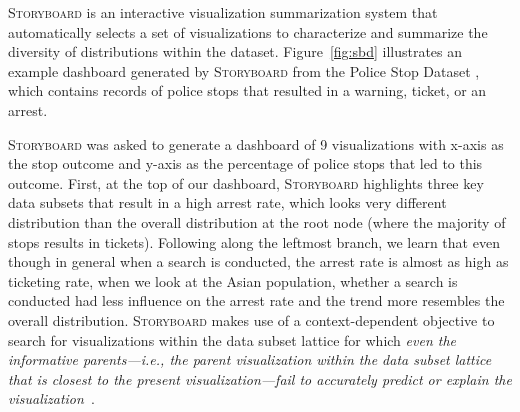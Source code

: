 \documentclass[11pt]{article}
\newcommand{\techreport}[1]{}
\newcommand{\sbd}{\textsc{Storyboard}\xspace}
\begin{document}
\par \sbd is an interactive visualization 
summarization system that automatically 
selects a set of visualizations 
to characterize and summarize 
the diversity of distributions within the dataset. 
Figure~\ref{fig:sbd} illustrates 
an example dashboard generated by \sbd 
from the Police Stop Dataset \cite{police}, 
which contains records of police stops 
that resulted in a warning, ticket, or an arrest. 
\techreport{The attributes in the dataset 
include driver gender, age, race, 
and the stop time, 
whether a search was conducted, and whether contraband was found. }
\sbd was asked to generate 
a dashboard of 9 visualizations 
with x-axis as the stop outcome
and y-axis as the percentage of police stops that led to this outcome. 
First, at the top of our dashboard, 
\sbd highlights three key data subsets 
that result in a high arrest rate, 
which looks very different distribution
than the overall distribution at the root node 
(where the majority of stops results in tickets). 
Following along the leftmost branch, we learn that even though in general when a search is conducted, the arrest rate is 
almost as high as ticketing rate, 
when we look at the Asian population, 
whether a search is conducted had less influence 
on the arrest rate and the trend more resembles the overall distribution. 
\sbd makes use of a context-dependent objective 
to search for visualizations within 
the data subset lattice
for which \emph{even the informative parents---i.e., the parent visualization
within the data subset lattice that is closest to the present visualization---fail to accurately predict or explain the visualization}~\cite{Lee2018}. 
\end{document}
